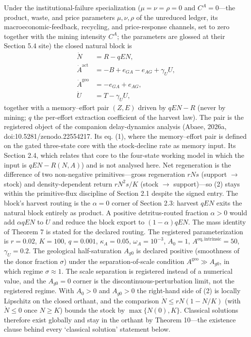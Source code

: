 \documentclass[11pt]{article}
\begin{document}
Under the institutional-failure specialization (\(\mu = \nu = \rho = 0\) and \(C^A = 0\)---the product, waste, and price parameters \(\mu, \nu, \rho\) of the unreduced ledger, its macroeconomic-feedback, recycling, and price-response channels, set to zero together with the mining intensity \(C^A\); the parameters are glossed at their Section 5.4 site) the closed natural block is \[\begin{aligned}
\dot N &= R - qEN, \\
\dot A^{\mathrm{act}} &= -B + e_{GA} - e_{AG} + \gamma_U U, \\
\dot A^{\mathrm{geo}} &= -e_{GA} + e_{AG}, \\
\dot U &= T - \gamma_U U,
\end{aligned} \tag{2}\] together with a memory--effort pair \((Z, E)\) driven by \(qEN - R\) (never by mining; \(q\) the per-effort extraction coefficient of the harvest law). The pair is the registered object of the companion delay-dynamics analysis (Abaee, 2026a, doi:10.5281/\allowbreak{}zenodo.22554217. Its eq. (1), where the memory--effort pair is defined on the gated three-state core with the stock-decline rate as memory input. Its Section 2.4, which relates that core to the four-state working model in which the input is \(qEN - R(N, A)\)) and is not analysed here. Net regeneration is the difference of two non-negative primitives---gross regeneration \(rNs\) (support \(\to\) stock) and density-dependent return \(rN^2 s/\allowbreak{}K\) (stock \(\to\) support)---so (2) stays within the primitive-flux discipline of Section 2.1 despite the signed entry. The block's harvest routing is the \(\alpha = 0\) corner of Section 2.3: harvest \(qEN\) exits the natural block entirely as product. A positive detritus-routed fraction \(\alpha > 0\) would add \(\alpha qEN\) to \(\dot U\) and reduce the block export to \((1-\alpha)qEN\). The mass identity of Theorem 7 is stated for the declared routing. The registered parameterization is \(r = 0.02\), \(K = 100\), \(q = 0.001\), \(\kappa_A = 0.05\), \(\omega_A = 10^{-3}\), \(A_0 = 1\), \(A^{\mathrm{eq,intrinsic}} = 50\), \(\gamma_U = 0.2\). The geological half-saturation \(A_{g0}\) is declared positive (smoothness of the donor fraction \(\sigma\)) under the separation-of-scale condition \(A^{\mathrm{geo}} \gg A_{g0}\), in which regime \(\sigma \approx 1\). The scale separation is registered instead of a numerical value, and the \(A_{g0} = 0\) corner is the discontinuous-perturbation limit, not the registered regime. With \(A_0 > 0\) and \(A_{g0} > 0\) the right-hand side of (2) is locally Lipschitz on the closed orthant, and the comparison \(\dot N \le rN(1 - N/\allowbreak{}K)\) (with \(\dot N \le 0\) once \(N \ge K\)) bounds the stock by \(\max\{N(0), K\}\). Classical solutions therefore exist globally and stay in the orthant by Theorem 10---the existence clause behind every `classical solution' statement below.
\end{document}
